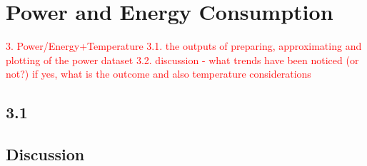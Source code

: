 \section{Power and Energy Consumption}
\noindent

\textcolor{red}{3. Power/Energy+Temperature
3.1. the outputs of preparing, approximating and plotting of the power dataset
3.2. discussion - what trends have been noticed (or not?) if yes, what is the outcome and also temperature considerations}


\subsection{3.1}

\subsection{Discussion}